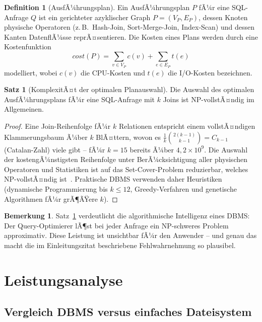 ﻿\documentclass[a4paper,12pt]{article}
\theoremstyle{definition}
\newtheorem{definition}{Definition}
\newtheorem{satz}{Satz}
\newtheorem{bemerkung}{Bemerkung}
\begin{document}
\begin{definition}[AusfÃ¼hrungsplan]
\label{def:plan}
Ein AusfÃ¼hrungsplan $P$ fÃ¼r eine SQL-Anfrage $Q$ ist ein gerichteter azyklischer Graph $P = (V_P, E_P)$, dessen Knoten physische Operatoren (z.\,B.\ Hash-Join, Sort-Merge-Join, Index-Scan) und dessen Kanten DatenflÃ¼sse reprÃ¤sentieren. Die Kosten eines Plans werden durch eine Kostenfunktion
\[
\mathit{cost}(P) = \sum_{v \in V_P} c(v) + \sum_{e \in E_P} t(e)
\]
modelliert, wobei $c(v)$ die CPU-Kosten und $t(e)$ die I/O-Kosten bezeichnen.
\end{definition}

\begin{satz}[KomplexitÃ¤t der optimalen Planauswahl]
\label{satz:optimierung}
Die Auswahl des optimalen AusfÃ¼hrungsplans fÃ¼r eine SQL-Anfrage mit $k$ Joins ist NP-vollstÃ¤ndig im Allgemeinen.
\end{satz}

\begin{proof}
Eine Join-Reihenfolge fÃ¼r $k$ Relationen entspricht einem vollstÃ¤ndigen Klammerungsbaum Ã¼ber $k$ BlÃ¤ttern, wovon es $\frac{1}{k} \binom{2(k-1)}{k-1} = C_{k-1}$ (Catalan-Zahl) viele gibt -- fÃ¼r $k = 15$ bereits Ã¼ber $4{,}2 \times 10^9$. Die Auswahl der kostengÃ¼nstigsten Reihenfolge unter BerÃ¼cksichtigung aller physischen Operatoren und Statistiken ist auf das Set-Cover-Problem reduzierbar, welches NP-vollstÃ¤ndig ist~\cite{ibaraki1984}. Praktische DBMS verwenden daher Heuristiken (dynamische Programmierung bis $k \leq 12$, Greedy-Verfahren und genetische Algorithmen fÃ¼r grÃ¶ÃŸere $k$).
\end{proof}

\begin{bemerkung}
Satz~\ref{satz:optimierung} verdeutlicht die algorithmische Intelligenz eines DBMS: Der Query-Optimierer lÃ¶st bei jeder Anfrage ein NP-schweres Problem approximativ. Diese Leistung ist unsichtbar fÃ¼r den Anwender -- und genau das macht die im Einleitungszitat beschriebene Fehlwahrnehmung so plausibel.
\end{bemerkung}

\section{Leistungsanalyse}
\label{sec:analyse}

\subsection{Vergleich DBMS versus einfaches Dateisystem}
\end{document}
